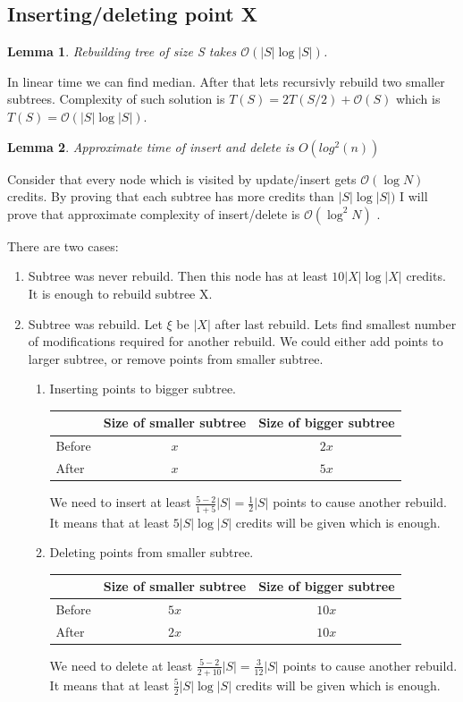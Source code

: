 \documentclass[10pt,a4paper]{article}
\newtheorem{lemma}{Lemma}
\newcommand{\Oh}{\mathcal{O}}
\begin{document}
\subsection{Inserting/deleting point X}
\begin{lemma}\label{lem:1}
Rebuilding tree of size S takes $\Oh(|S| \log |S|)$.
\end{lemma}

In linear time we can find median. After that lets recursivly rebuild two smaller subtrees. Complexity of such solution is $T(S) = 2 T(S/2) + \Oh(S)$ which is $T(S) = \Oh(|S| \log |S|).$

\begin{lemma}\label{lem:2}
Approximate time of insert and delete is $O(log^2 (n))$
\end{lemma}

Consider that every node which is visited by update/insert gets $\Oh(\log N)$ credits. By proving that each subtree has more credits than $|S| \log |S|)$ I will prove that approximate complexity of insert/delete is $\Oh(\log^2{N})$ .

There are two cases:
\begin{enumerate}
\item Subtree was never rebuild. Then this node has at least $10 |X| \log |X|$ credits. It is enough to rebuild subtree X.
\item Subtree was rebuild. Let $\xi$ be $|X|$ after last rebuild. Lets find smallest number of modifications required for another rebuild. We could either add points to larger subtree, or remove points from smaller subtree.
\begin{enumerate}
\item Inserting points to bigger subtree.

\begin{tabular}{|l|c|c|}
\hline  & Size of smaller subtree & Size of bigger subtree  \\
\hline Before & $x$ & $2x$ \\
\hline After & $x$ & $5x$ \\
\hline 
\end{tabular}

We need to insert at least $ \frac{5 - 2}{1 + 5} |S| = \frac{1}{2} |S|$ points to cause another rebuild. It means that at least $5 |S| \log |S|$ credits will be given which is enough. 

\bigskip
\item Deleting points from smaller subtree.

\begin{tabular}{|l|c|c|}
\hline  & Size of smaller subtree & Size of bigger subtree  \\
\hline Before & $5x$ & $10x$ \\
\hline After & $2x$ & $10x$ \\
\hline 
\end{tabular}

We need to delete at least $\frac{5 - 2}{2 + 10} |S| = \frac{3}{12} |S|$ points to cause another rebuild. It means that at least $\frac{5}{2} |S| \log |S|$ credits will be given which is enough. 

\end{enumerate}
\end{enumerate}
\end{document}
